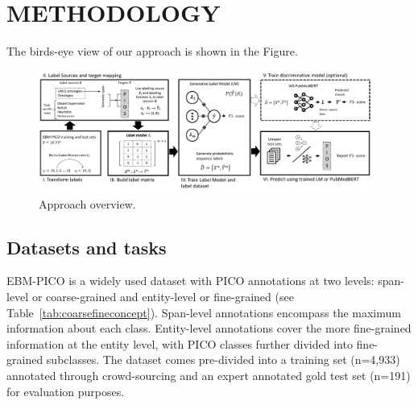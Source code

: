 \documentclass[10.7pt,]{article}
\begin{document}
\section{METHODOLOGY}\label{methods}
%
The birds-eye view of our approach is shown in the Figure.
%
\begin{figure}[ht]
\centering
\includegraphics[width=0.98\textwidth]{figures/approach.pdf}
\caption{Approach overview.}
\label{fig:approach}
\end{figure}
%
%
%
\subsection{Datasets and tasks}\label{data}
%
EBM-PICO is a widely used dataset with PICO annotations at two levels: span-level or coarse-grained and entity-level or fine-grained (see Table~\ref{tab:coarsefineconcept}).
Span-level annotations encompass the maximum information about each class.
Entity-level annotations cover the more fine-grained information at the entity level, with PICO classes further divided into fine-grained subclasses.
The dataset comes pre-divided into a training set (n=4,933) annotated through crowd-sourcing and an expert annotated gold test set (n=191) for evaluation purposes.
\end{document}

